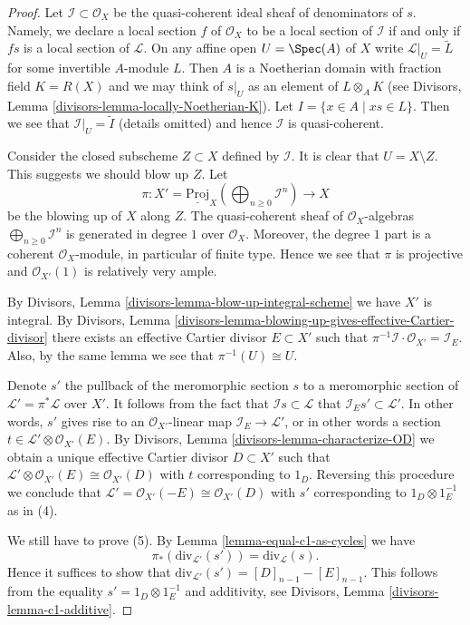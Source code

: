 \begin{proof}
Let $\mathcal{I} \subset \mathcal{O}_X$ be the quasi-coherent ideal sheaf
of denominators of $s$. Namely, we declare a local section
$f$ of $\mathcal{O}_X$ to be a local section of $\mathcal{I}$
if and only if $fs$ is a local section of $\mathcal{L}$.
On any affine open $U = \Spec(A)$
of $X$ write $\mathcal{L}|_U = \widetilde{L}$ for some invertible
$A$-module $L$. Then $A$ is a Noetherian domain with fraction field
$K = R(X)$ and we may think of $s|_U$ as an element of
$L \otimes_A K$ (see
Divisors, Lemma \ref{divisors-lemma-locally-Noetherian-K}).
Let $I = \{x \in A \mid xs \in L\}$. Then we see that
$\mathcal{I}|_U = \widetilde{I}$ (details omitted) and hence
$\mathcal{I}$ is quasi-coherent.

\medskip\noindent
Consider the closed subscheme $Z \subset X$ defined by $\mathcal{I}$.
It is clear that $U = X \setminus Z$. This suggests we should blow
up $Z$. Let
$$
\pi : X' =
\underline{\text{Proj}}_X
\left(\bigoplus\nolimits_{n \geq 0} \mathcal{I}^n\right)
\longrightarrow
X
$$
be the blowing up of $X$ along $Z$. The quasi-coherent
sheaf of $\mathcal{O}_X$-algebras
$\bigoplus\nolimits_{n \geq 0} \mathcal{I}^n$
is generated in degree $1$ over $\mathcal{O}_X$.
Moreover, the degree $1$ part is a coherent $\mathcal{O}_X$-module,
in particular of finite type. Hence we see that $\pi$
is projective and $\mathcal{O}_{X'}(1)$ is relatively very ample.

\medskip\noindent
By Divisors, Lemma \ref{divisors-lemma-blow-up-integral-scheme}
we have $X'$ is integral. By
Divisors, Lemma \ref{divisors-lemma-blowing-up-gives-effective-Cartier-divisor}
there exists an effective Cartier divisor $E \subset X'$ such that
$\pi^{-1}\mathcal{I} \cdot \mathcal{O}_{X'} = \mathcal{I}_E$.
Also, by the same lemma we see that $\pi^{-1}(U) \cong U$.

\medskip\noindent
Denote $s'$ the pullback of the meromorphic section $s$ to a meromorphic
section of $\mathcal{L}' = \pi^*\mathcal{L}$ over $X'$.
It follows from the fact that $\mathcal{I}s \subset \mathcal{L}$
that $\mathcal{I}_Es' \subset \mathcal{L}'$. In other words,
$s'$ gives rise to an $\mathcal{O}_{X'}$-linear map
$\mathcal{I}_E \to \mathcal{L}'$, or in other words
a section $t \in \mathcal{L}' \otimes \mathcal{O}_{X'}(E)$.
By Divisors, Lemma \ref{divisors-lemma-characterize-OD} we obtain a unique
effective Cartier divisor $D \subset X'$ such that
$\mathcal{L}' \otimes \mathcal{O}_{X'}(E) \cong \mathcal{O}_{X'}(D)$
with $t$ corresponding to $1_D$. Reversing this procedure
we conclude that
$\mathcal{L}' = \mathcal{O}_{X'}(-E) \cong \mathcal{O}_{X'}(D)$
with $s'$ corresponding to $1_D \otimes 1_E^{-1}$ as in (4).

\medskip\noindent
We still have to prove (5).
By Lemma \ref{lemma-equal-c1-as-cycles} we have
$$
\pi_*(\text{div}_{\mathcal{L}'}(s')) = \text{div}_\mathcal{L}(s).
$$
Hence it suffices to show that
$\text{div}_{\mathcal{L}'}(s') = [D]_{n - 1} - [E]_{n - 1}$.
This follows from the equality
$s' = 1_D \otimes 1_E^{-1}$ and additivity, see
Divisors, Lemma \ref{divisors-lemma-c1-additive}.
\end{proof}

